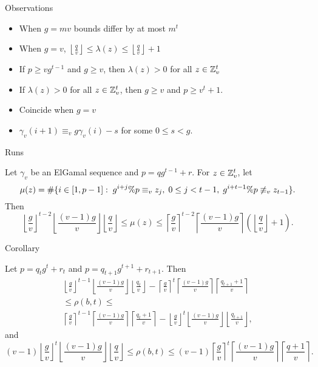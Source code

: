 \begin{frame}{Observations}

  \begin{itemize}
  \item When $g=mv$ bounds differ by at most $m^t$
    \item When $g=v$, $\left \lfloor\frac{q}{v} \right \rfloor \leq \lambda(z) \leq   
      \left \lfloor\frac{q}{v} \right\rfloor +1$
    \item If $p \geq v g^{t-1}$ and $g \geq v$, then $\lambda(z) > 0$ for all $z \in \mathbb{Z}_v^t$
    \item If $\lambda(z) > 0$ for all $z \in \mathbb{Z}_v^t$, then $g \geq v$ and $p \geq v^t+1$.
    \item Coincide when $g=v$
      \item $\gamma_v(i+1) \equiv_v g\gamma_v(i)- s$ for some $ 0 \leq s < g$.
    \end{itemize}
  
\end{frame}

\begin{frame}{Runs}
\begin{theorem}\label{elgamal_run}
Let $\gamma_v$ be an ElGamal sequence and $p = q g^{t-1} + r$.  For $z \in \mathbb{Z}_v^t$, let 
  \[
    \mu(z) = \#{\{ i \in [1,p-1]:\; g^{i+j}\% p \equiv_v z_j,\; 0 \leq j < t-1,
                    \; g^{i+t-1}\% p \not\equiv_v z_{t-1}\}}.
                \]
                Then
  \[
    \left \lfloor \frac{g}{v} \right \rfloor^{t-2} \left \lfloor \frac{(v-1)g}{v} \right \rfloor \left \lfloor\frac{q}{v} \right \rfloor \leq \mu(z) \leq  \left \lceil \frac{g}{v} \right \rceil^{t-2} \left \lceil \frac{(v-1)g}{v} \right \rceil\left(\left \lfloor\frac{q}{v} \right\rfloor +1 \right).
  \]
\end{theorem}
  
\end{frame}

\begin{frame}{Corollary}

  Let $p = q_t g^{t} + r_t$ and $p = q_{t+1} g^{t+1} + r_{t+1}$.  Then
\begin{multline*}
\left \lfloor \frac{g}{v} \right \rfloor^{t-1}\left \lfloor \frac{(v-1)g}{v} \right \rfloor \left \lfloor \frac{q_t}{v}\right \rfloor - \left \lceil \frac{g}{v} \right \rceil^{t}\left \lceil \frac{(v-1)g}{v} \right \rceil \left \lceil \frac{q_{t+1}+1}{v} \right \rceil  \\
\leq  \rho(b,t) \leq \\
\left \lceil \frac{g}{v} \right \rceil^{t-1}\left \lceil \frac{(v-1)g}{v} \right \rceil \left \lceil \frac{q_{t}+1}{v} \right \rceil - \left \lfloor \frac{g}{v} \right \rfloor^{t}\left \lfloor \frac{(v-1)g}{v} \right \rfloor \left  \lfloor \frac{q_{t+1}}{v} \right \rfloor,
\end{multline*}
and
  \[
    (v-1) \left \lfloor \frac{g}{v} \right \rfloor^{t} \left \lfloor \frac{(v-1)g}{v} \right \rfloor\left \lfloor\frac{q}{v} \right \rfloor \leq \rho(b,t) \leq  (v-1)\left \lceil \frac{g}{v} \right \rceil^{t}\left \lceil \frac{(v-1)g}{v} \right \rceil \left \lceil\frac{q+1}{v} \right\rceil.
  \]
  
\end{frame}


